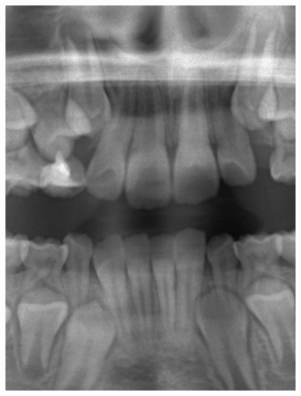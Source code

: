 \documentclass[a4paper,titlepage,12pt]{article}
\begin{document}
\begin{figure}
  \centering
	\begin{minipage}[b]{0.32\linewidth}
		\includegraphics[width=\linewidth]{preprocess/original.png}
	\end{minipage}
	\begin{minipage}[b]{0.32\linewidth}

\end{minipage}
\end{figure}
\end{document}
